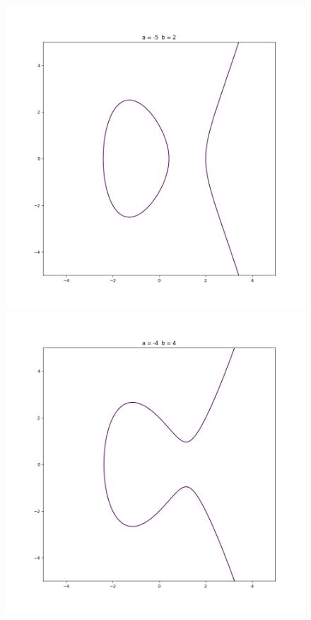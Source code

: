 \documentclass[12pt,a4paper]{report}
\begin{document}
\begin{figure}[h!]
	\includegraphics[scale=0.32]{Figure_3}
	\includegraphics[scale=0.32]{Figure_4}
\end{figure}
\cleardoublepage
\end{document}
